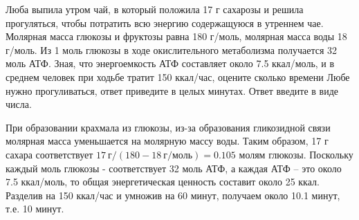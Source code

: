 
Люба выпила утром чай, в который положила 17 г
сахарозы и решила прогуляться, чтобы потратить всю энергию содержащуюся в
утреннем чае. Молярная масса глюкозы и фруктозы равна 180 г/моль, молярная
масса воды 18 г/моль. Из 1 моль глюкозы в ходе окислительного метаболизма
получается 32  моль АТФ. Зная, что
энергоемкость АТФ составляет около 7.5 ккал/моль, и в среднем человек при
ходьбе тратит 150 ккал/час, оцените сколько времени Любе нужно прогуливаться,
ответ приведите в целых минутах. Ответ введите в виде числа.

\solutionSection

При образовании крахмала из глюкозы, из-за образования гликозидной связи молярная масса уменьшается 
на молярную массу воды. Таким образом, 17 г сахара соответствует $17 \: \text{г}/(180-18 \: \text{г/моль})=0.105$ молям 
глюкозы. Поскольку каждый моль глюкозы - соответствует 32 моль АТФ, а каждая АТФ – это около 7.5 ккал/моль, 
то общая энергетическая ценность составит около 25 ккал. Разделив на 150 ккал/час 
и умножив на 60 минут, получаем около 10.1 минут, т.е. 10 минут.

